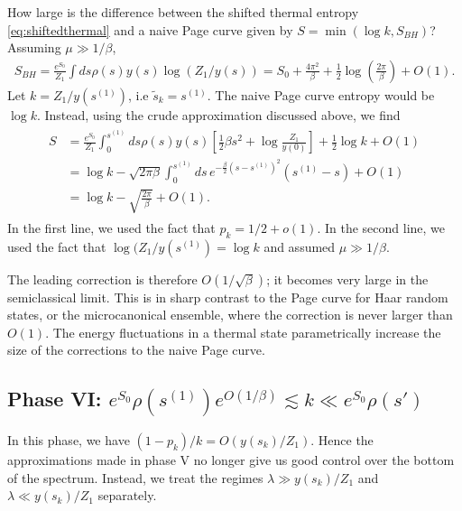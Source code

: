 \documentclass[12pt]{article}
\renewcommand{\tilde}{\widetilde}
\newcommand{\smax}{s_k}
\newcommand{\stilde}{\tilde{s}_k}
\newcommand{\sprime}{s'}
\numberwithin{equation}{section}
\begin{document}
How large is the difference between the shifted thermal entropy \eqref{eq:shiftedthermal} and a naive Page curve given by $S =  \min(\log k , S_{BH})$? Assuming $\mu \gg 1/\beta$,
\begin{align}
S_{BH} = \frac{e^{S_0}}{Z_1} \int ds \rho(s) y(s) \log(Z_1/ y(s)) = S_0 + \frac{4 \pi^2}{\beta} + \frac{1}{2} \log \left(\frac{2 \pi}{\beta}\right) + O(1).
\end{align}
Let $k = Z_1/y(s^{(1)})$, i.e $\stilde = s^{(1)}$. The naive Page curve entropy would be $\log k$. Instead, using the crude approximation discussed above, we find
\begin{align}
\begin{split}
S & = \frac{e^{S_0}}{Z_1}\int_0^{s^{(1)}} ds \rho(s) y(s) \left[\frac{1}{2} \beta s^2 +  \log \frac{Z_1}{y(0)}\right] +  \frac{1}{2} \log k + O(1) \\&= \log k  - \sqrt{2 \pi \beta} \int_0^{s^{(1)}} ds \,e^{-\frac{\beta}{2} (s - s^{(1)})^2}  (s^{(1)} - s) + O(1) \\&= \log k - \sqrt{\frac{2 \pi}{ \beta}} + O(1).
\end{split}
\end{align}
In the first line, we used the fact that $p_k = 1/2 + o(1)$. In the second line, we used the fact that $\log(Z_1/y(s^{(1)}) = \log k$ and assumed $\mu \gg 1/\beta$.

The leading correction is therefore $O(1/\sqrt{\beta})$; it becomes very large in the semiclassical limit. This is in sharp contrast to the Page curve for Haar random states, or the microcanonical ensemble, where the correction is never larger than $O(1)$. The energy fluctuations in a thermal state parametrically increase the size of the corrections to the naive Page curve.

\subsection*{Phase VI: $e^{S_0} \rho( s^{(1)})e^{O(1/\beta)} \lesssim k \ll e^{S_0} \rho(\sprime)$}
In this phase, we have $(1-p_k)/k = O(y(\smax)/Z_1)$. Hence the approximations made in phase V no longer give us good control over the bottom of the spectrum. Instead, we treat the regimes $\lambda \gg y(\smax)/Z_1$ and $\lambda \ll y(\smax)/Z_1$ separately.
\end{document}
